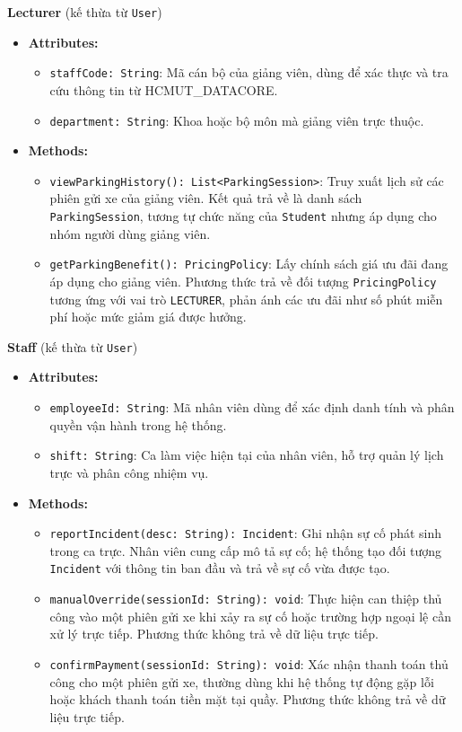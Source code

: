 \noindent\textbf{Lecturer} (kế thừa từ \texttt{User})
\begin{itemize}
	\item \textbf{Attributes:}
	\begin{itemize}
		\item \texttt{staffCode: String}: Mã cán bộ của giảng viên, dùng để xác thực và tra cứu thông tin từ \mbox{HCMUT\_DATACORE}.
		\item \texttt{department: String}: Khoa hoặc bộ môn mà giảng viên trực thuộc.
	\end{itemize}
	\item \textbf{Methods:}
	\begin{itemize}
		\item \texttt{viewParkingHistory(): List<ParkingSession>}: Truy xuất lịch sử các phiên gửi xe của giảng viên. Kết quả trả về là danh sách \texttt{ParkingSession}, tương tự chức năng của \texttt{Student} nhưng áp dụng cho nhóm người dùng giảng viên.
		\item \texttt{getParkingBenefit(): PricingPolicy}: Lấy chính sách giá ưu đãi đang áp dụng cho giảng viên. Phương thức trả về đối tượng \texttt{PricingPolicy} tương ứng với vai trò \texttt{LECTURER}, phản ánh các ưu đãi như số phút miễn phí hoặc mức giảm giá được hưởng.
	\end{itemize}
\end{itemize}

\noindent\textbf{Staff} (kế thừa từ \texttt{User})
\begin{itemize}
	\item \textbf{Attributes:}
	\begin{itemize}
		\item \texttt{employeeId: String}: Mã nhân viên dùng để xác định danh tính và phân quyền vận hành trong hệ thống.
		\item \texttt{shift: String}: Ca làm việc hiện tại của nhân viên, hỗ trợ quản lý lịch trực và phân công nhiệm vụ.
	\end{itemize}
	\item \textbf{Methods:}
	\begin{itemize}
		\item \texttt{reportIncident(desc: String): Incident}: Ghi nhận sự cố phát sinh trong ca trực. Nhân viên cung cấp mô tả sự cố; hệ thống tạo đối tượng \texttt{Incident} với thông tin ban đầu và trả về sự cố vừa được tạo.
		\item \texttt{manualOverride(sessionId: String): void}: Thực hiện can thiệp thủ công vào một phiên gửi xe khi xảy ra sự cố hoặc trường hợp ngoại lệ cần xử lý trực tiếp. Phương thức không trả về dữ liệu trực tiếp.
		\item \texttt{confirmPayment(sessionId: String): void}: Xác nhận thanh toán thủ công cho một phiên gửi xe, thường dùng khi hệ thống tự động gặp lỗi hoặc khách thanh toán tiền mặt tại quầy. Phương thức không trả về dữ liệu trực tiếp.
	\end{itemize}
\end{itemize}

